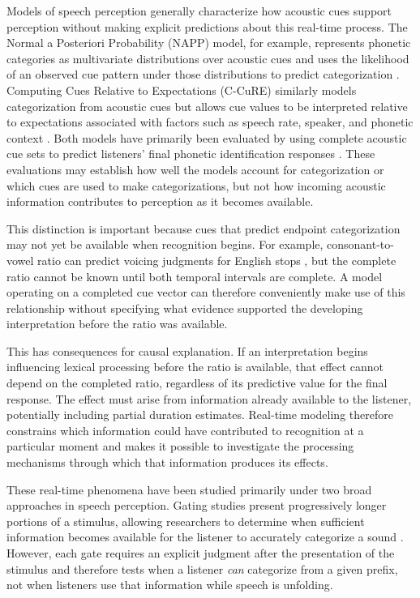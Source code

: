 \documentclass[12pt]{article}
\begin{document}
Models of speech perception generally characterize how acoustic cues support perception without making explicit predictions about this real-time process.
%
The Normal a Posteriori Probability (NAPP) model, for example, represents phonetic categories as multivariate distributions over acoustic cues and uses the likelihood of an observed cue pattern under those distributions to predict categorization \citep{Nearey1997}.
%
Computing Cues Relative to Expectations (C-CuRE) similarly models categorization from acoustic cues but allows cue values to be interpreted relative to expectations associated with factors such as speech rate, speaker, and phonetic context \citep{McMurrayJongman2011}.
%
Both models have primarily been evaluated by using complete acoustic cue sets to predict listeners' final phonetic identification responses \citep{Nearey1997,MaddoxMolisDiehl2002,ColeEtAl2010,McMurrayJongman2011}.
%
These evaluations may establish how well the models account for categorization or which cues are used to make categorizations, but not how incoming acoustic information contributes to perception as it becomes available.

This distinction is important because cues that predict endpoint categorization may not yet be available when recognition begins.
%
For example, consonant-to-vowel ratio can predict voicing judgments for English stops \citep{PortDalby1982}, but the complete ratio cannot be known until both temporal intervals are complete.
%
A model operating on a completed cue vector can therefore conveniently make use of this relationship without specifying what evidence supported the developing interpretation before the ratio was available.

This has consequences for causal explanation.
%
If an interpretation begins influencing lexical processing before the ratio is available, that effect cannot depend on the completed ratio, regardless of its predictive value for the final response.
%
The effect must arise from information already available to the listener, potentially including partial duration estimates.
%
Real-time modeling therefore constrains which information could have contributed to recognition at a particular moment and makes it possible to investigate the processing mechanisms through which that information produces its effects.

These real-time phenomena have been studied primarily under two broad approaches in speech perception.
%
Gating studies present progressively longer portions of a stimulus, allowing researchers to determine when sufficient information becomes available for the listener to accurately categorize a sound \citep{Grosjean1980}.
%
However, each gate requires an explicit judgment after the presentation of the stimulus and therefore tests when a listener \textit{can} categorize from a given prefix, not when listeners use that information while speech is unfolding. 
\end{document}
